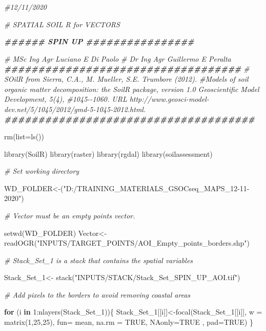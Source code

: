 \documentclass[
  10pt,
  b5paper,
]{book}
\newenvironment{Shaded}{\begin{snugshade}}{\end{snugshade}}
\newcommand{\AttributeTok}[1]{\textcolor[rgb]{0.77,0.63,0.00}{#1}}
\newcommand{\CommentTok}[1]{\textcolor[rgb]{0.56,0.35,0.01}{\textit{#1}}}
\newcommand{\ConstantTok}[1]{\textcolor[rgb]{0.00,0.00,0.00}{#1}}
\newcommand{\ControlFlowTok}[1]{\textcolor[rgb]{0.13,0.29,0.53}{\textbf{#1}}}
\newcommand{\DecValTok}[1]{\textcolor[rgb]{0.00,0.00,0.81}{#1}}
\newcommand{\DocumentationTok}[1]{\textcolor[rgb]{0.56,0.35,0.01}{\textbf{\textit{#1}}}}
\newcommand{\FunctionTok}[1]{\textcolor[rgb]{0.00,0.00,0.00}{#1}}
\newcommand{\NormalTok}[1]{#1}
\newcommand{\OtherTok}[1]{\textcolor[rgb]{0.56,0.35,0.01}{#1}}
\newcommand{\SpecialCharTok}[1]{\textcolor[rgb]{0.00,0.00,0.00}{#1}}
\newcommand{\StringTok}[1]{\textcolor[rgb]{0.31,0.60,0.02}{#1}}
\begin{document}
\begin{Shaded}
\begin{Highlighting}[]
\CommentTok{\#12/11/2020}

\CommentTok{\# SPATIAL SOIL R  for VECTORS}

\DocumentationTok{\#\#\#\#\#\# SPIN UP \#\#\#\#\#\#\#\#\#\#\#\#\#\#\#\#}

\CommentTok{\# MSc Ing Agr Luciano E Di Paolo}
\CommentTok{\# Dr Ing Agr Guillermo E Peralta}
\DocumentationTok{\#\#\#\#\#\#\#\#\#\#\#\#\#\#\#\#\#\#\#\#\#\#\#\#\#\#\#\#\#\#\#\#\#\#\#}
\CommentTok{\# SOilR from Sierra, C.A., M. Mueller, S.E. Trumbore (2012). }
\CommentTok{\#Models of soil organic matter decomposition: the SoilR package, version 1.0 Geoscientific Model Development, 5(4), }
\CommentTok{\#1045{-}{-}1060. URL http://www.geosci{-}model{-}dev.net/5/1045/2012/gmd{-}5{-}1045{-}2012.html.}
\DocumentationTok{\#\#\#\#\#\#\#\#\#\#\#\#\#\#\#\#\#\#\#\#\#\#\#\#\#\#\#\#\#\#\#\#\#\#\#\#\#}

\FunctionTok{rm}\NormalTok{(}\AttributeTok{list=}\FunctionTok{ls}\NormalTok{()) }

\FunctionTok{library}\NormalTok{(SoilR)}
\FunctionTok{library}\NormalTok{(raster)}
\FunctionTok{library}\NormalTok{(rgdal)}
\FunctionTok{library}\NormalTok{(soilassessment)}


\CommentTok{\# Set working directory }

\NormalTok{WD\_FOLDER}\OtherTok{\textless{}{-}}\NormalTok{(}\StringTok{"D:/TRAINING\_MATERIALS\_GSOCseq\_MAPS\_12{-}11{-}2020"}\NormalTok{)}

\CommentTok{\# Vector must be an empty points vector. }

\FunctionTok{setwd}\NormalTok{(WD\_FOLDER)}
\NormalTok{Vector}\OtherTok{\textless{}{-}}\FunctionTok{readOGR}\NormalTok{(}\StringTok{"INPUTS/TARGET\_POINTS/AOI\_Empty\_points\_borders.shp"}\NormalTok{)}

\CommentTok{\# Stack\_Set\_1 is a stack that contains the spatial variables }

\NormalTok{Stack\_Set\_1}\OtherTok{\textless{}{-}} \FunctionTok{stack}\NormalTok{(}\StringTok{"INPUTS/STACK/Stack\_Set\_SPIN\_UP\_AOI.tif"}\NormalTok{)}

\CommentTok{\# Add pixels to the borders to avoid removing coastal areas}

\ControlFlowTok{for}\NormalTok{ (i }\ControlFlowTok{in} \DecValTok{1}\SpecialCharTok{:}\FunctionTok{nlayers}\NormalTok{(Stack\_Set\_1))\{}
\NormalTok{  Stack\_Set\_1[[i]]}\OtherTok{\textless{}{-}}\FunctionTok{focal}\NormalTok{(Stack\_Set\_1[[i]], }\AttributeTok{w =} \FunctionTok{matrix}\NormalTok{(}\DecValTok{1}\NormalTok{,}\DecValTok{25}\NormalTok{,}\DecValTok{25}\NormalTok{), }\AttributeTok{fun=}\NormalTok{ mean,  }\AttributeTok{na.rm =} \ConstantTok{TRUE}\NormalTok{, }\AttributeTok{NAonly=}\ConstantTok{TRUE}\NormalTok{ , }\AttributeTok{pad=}\ConstantTok{TRUE}\NormalTok{)}
\NormalTok{\}}


\end{Highlighting}
\end{Shaded}
\end{document}

